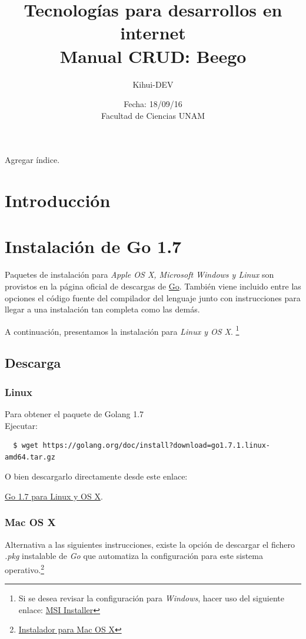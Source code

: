 \documentclass[12pt]{article}
\title{Tecnologías para desarrollos en internet \\ Manual CRUD: Beego}
\author{Kihui-DEV}
\date{Fecha: 18/09/16 \\ Facultad de Ciencias UNAM}
\begin{document}
\maketitle
Agregar índice.
\section{Introducción}
\section{Instalación de Go 1.7}
Paquetes de instalación para \textit{Apple OS X, Microsoft Windows y Linux} son provistos en la página oficial de descargas de \href{https://golang.org/dl/}{Go}. También viene incluido entre las opciones el código fuente del compilador del lenguaje junto con instrucciones para llegar a una instalación tan completa como las demás. \par
A continuación, presentamos la instalación para \textit{Linux y OS X}. \footnote{Si se desea revisar la configuración para \textit{Windows}, hacer uso del siguiente enlace:
  \href{https://golang.org/doc/install?download=go1.7.1.windows-amd64.msi}{MSI Installer}}

\subsection*{Descarga}


\subsubsection*{Linux}
Para obtener el paquete de Golang 1.7 \\
Ejecutar:
\begin{verbatim}
  $ wget https://golang.org/doc/install?download=go1.7.1.linux-amd64.tar.gz
\end{verbatim}
O bien descargarlo directamente desde este enlace:
\begin{center}
\href{https://golang.org/doc/install?download=go1.7.1.linux-amd64.tar.gz}{Go 1.7 para Linux y OS X}.
\end{center}


\subsubsection*{Mac OS X}
Alternativa a las siguientes instrucciones, existe la opción de descargar el fichero \textit{.pkg} instalable de \textit{Go} que automatiza la configuración para este sistema operativo.\footnote{\href{https://golang.org/doc/install?download=go1.7.1.darwin-amd64.pkg}{Instalador para Mac OS X}}\\[1mm]
\end{document}
